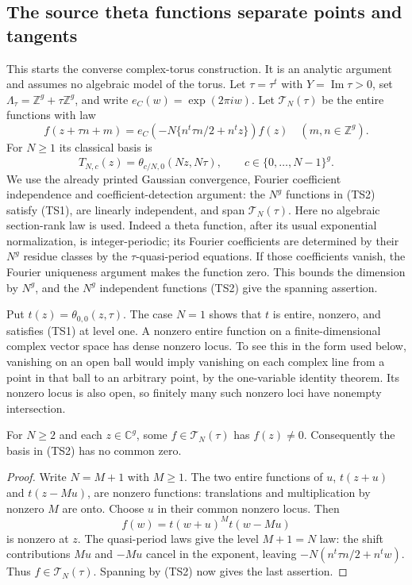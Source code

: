 \subsection{The source theta functions separate points and tangents}
\label{subsec:ftb-torus-theta-separation}

This starts the converse complex-torus construction.
It is an analytic argument and assumes no algebraic model of
the torus.  Let \(\tau=\tau^t\) with
\(Y=\operatorname{Im}\tau>0\), set
\(\Lambda_\tau=\mathbb Z^g+\tau\mathbb Z^g\), and write
\(e_C(w)=\exp(2\pi iw)\).
Let \(\mathcal T_N(\tau)\) be the entire functions with law
\[
 f(z+\tau n+m)=
 e_C\!\left(-N\{n^t\tau n/2+n^tz\}\right)f(z)
                       \quad(m,n\in\mathbb Z^g).         \tag{TS1}
\]
For \(N\ge1\) its classical basis is
\[
 T_{N,c}(z)=
 \theta_{c/N,0}(Nz,N\tau),
                     \qquad c\in\{0,\ldots,N-1\}^g .
 \tag{TS2}
\]
We use the already printed Gaussian convergence,
Fourier coefficient independence and coefficient-detection
argument: the \(N^g\) functions in (TS2) satisfy (TS1),
are linearly independent, and span \(\mathcal T_N(\tau)\).
Here no algebraic section-rank law is used.
Indeed a theta function, after its usual exponential
normalization, is integer-periodic; its Fourier coefficients
are determined by their \(N^g\) residue classes by the
\(\tau\)-quasi-period equations.
If those coefficients vanish, the Fourier uniqueness
argument makes the function zero.
This bounds the dimension by \(N^g\), and the \(N^g\)
independent functions (TS2) give the spanning assertion.

Put \(t(z)=\theta_{0,0}(z,\tau)\).
The case \(N=1\) shows that \(t\) is entire, nonzero, and
satisfies (TS1) at level one.
A nonzero entire function on a finite-dimensional complex
vector space has dense nonzero locus.
To see this in the form used below, vanishing on an open
ball would imply vanishing on each complex line from a
point in that ball to an arbitrary point, by the
one-variable identity theorem.
Its nonzero locus is also open, so finitely many such
nonzero loci have nonempty intersection.

\begin{lemma}
\label{lem:ftb-torus-theta-no-base-points}
For \(N\ge2\) and each \(z\in\mathbb C^g\), some
\(f\in\mathcal T_N(\tau)\) has \(f(z)\ne0\).
Consequently the basis in (TS2) has no common zero.
\end{lemma}
\begin{proof}
Write \(N=M+1\) with \(M\ge1\).
The two entire functions of \(u\),
\(t(z+u)\) and \(t(z-Mu)\), are nonzero functions:
translations and multiplication by nonzero \(M\) are onto.
Choose \(u\) in their common nonzero locus.
Then
\[
                   f(w)=t(w+u)^M t(w-Mu)
\]
is nonzero at \(z\).
The quasi-period laws give the level \(M+1=N\) law:
the shift contributions \(Mu\) and \(-Mu\) cancel in the
exponent, leaving
\(-N(n^t\tau n/2+n^tw)\).
Thus \(f\in\mathcal T_N(\tau)\).
Spanning by (TS2) now gives the last assertion.
\end{proof}

